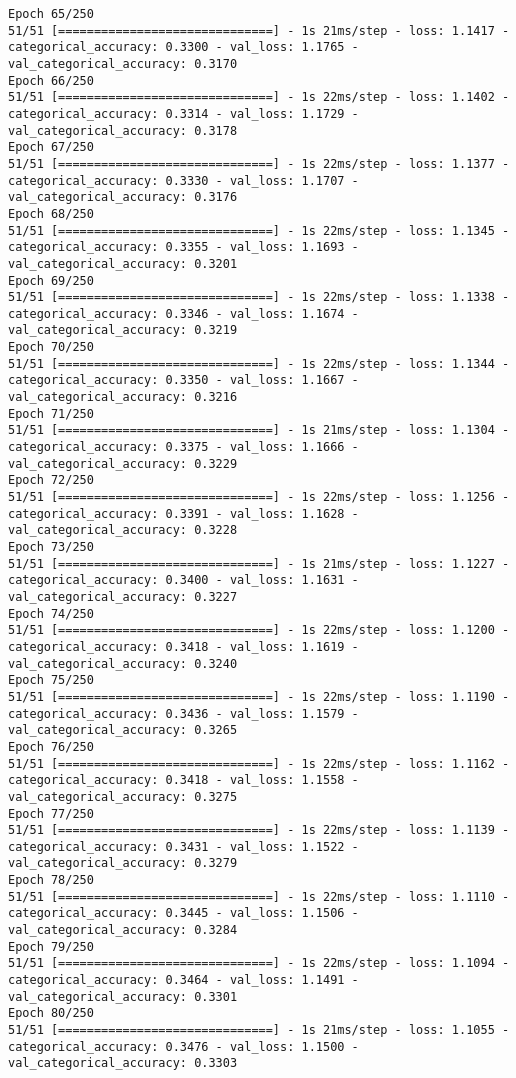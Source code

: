 \begin{lstlisting}
Epoch 65/250
51/51 [==============================] - 1s 21ms/step - loss: 1.1417 - categorical_accuracy: 0.3300 - val_loss: 1.1765 - val_categorical_accuracy: 0.3170
Epoch 66/250
51/51 [==============================] - 1s 22ms/step - loss: 1.1402 - categorical_accuracy: 0.3314 - val_loss: 1.1729 - val_categorical_accuracy: 0.3178
Epoch 67/250
51/51 [==============================] - 1s 22ms/step - loss: 1.1377 - categorical_accuracy: 0.3330 - val_loss: 1.1707 - val_categorical_accuracy: 0.3176
Epoch 68/250
51/51 [==============================] - 1s 22ms/step - loss: 1.1345 - categorical_accuracy: 0.3355 - val_loss: 1.1693 - val_categorical_accuracy: 0.3201
Epoch 69/250
51/51 [==============================] - 1s 22ms/step - loss: 1.1338 - categorical_accuracy: 0.3346 - val_loss: 1.1674 - val_categorical_accuracy: 0.3219
Epoch 70/250
51/51 [==============================] - 1s 22ms/step - loss: 1.1344 - categorical_accuracy: 0.3350 - val_loss: 1.1667 - val_categorical_accuracy: 0.3216
Epoch 71/250
51/51 [==============================] - 1s 21ms/step - loss: 1.1304 - categorical_accuracy: 0.3375 - val_loss: 1.1666 - val_categorical_accuracy: 0.3229
Epoch 72/250
51/51 [==============================] - 1s 22ms/step - loss: 1.1256 - categorical_accuracy: 0.3391 - val_loss: 1.1628 - val_categorical_accuracy: 0.3228
Epoch 73/250
51/51 [==============================] - 1s 21ms/step - loss: 1.1227 - categorical_accuracy: 0.3400 - val_loss: 1.1631 - val_categorical_accuracy: 0.3227
Epoch 74/250
51/51 [==============================] - 1s 22ms/step - loss: 1.1200 - categorical_accuracy: 0.3418 - val_loss: 1.1619 - val_categorical_accuracy: 0.3240
Epoch 75/250
51/51 [==============================] - 1s 22ms/step - loss: 1.1190 - categorical_accuracy: 0.3436 - val_loss: 1.1579 - val_categorical_accuracy: 0.3265
Epoch 76/250
51/51 [==============================] - 1s 22ms/step - loss: 1.1162 - categorical_accuracy: 0.3418 - val_loss: 1.1558 - val_categorical_accuracy: 0.3275
Epoch 77/250
51/51 [==============================] - 1s 22ms/step - loss: 1.1139 - categorical_accuracy: 0.3431 - val_loss: 1.1522 - val_categorical_accuracy: 0.3279
Epoch 78/250
51/51 [==============================] - 1s 22ms/step - loss: 1.1110 - categorical_accuracy: 0.3445 - val_loss: 1.1506 - val_categorical_accuracy: 0.3284
Epoch 79/250
51/51 [==============================] - 1s 22ms/step - loss: 1.1094 - categorical_accuracy: 0.3464 - val_loss: 1.1491 - val_categorical_accuracy: 0.3301
Epoch 80/250
51/51 [==============================] - 1s 21ms/step - loss: 1.1055 - categorical_accuracy: 0.3476 - val_loss: 1.1500 - val_categorical_accuracy: 0.3303

\end{lstlisting}
